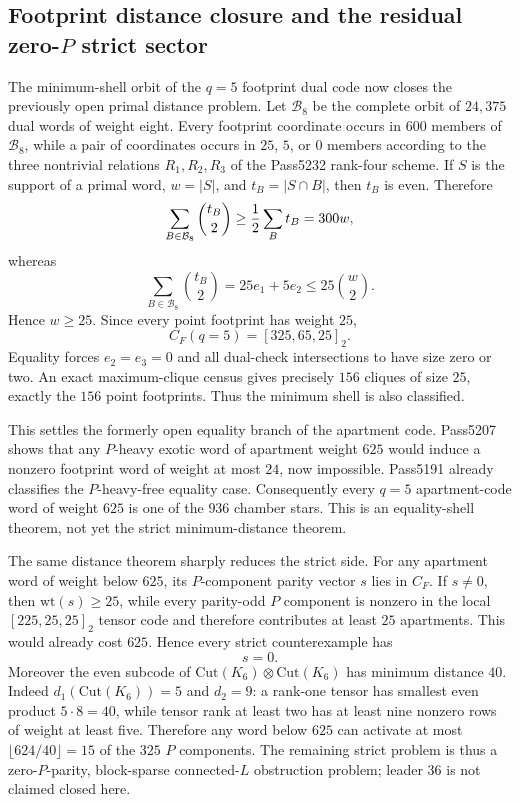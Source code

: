 \subsection{Footprint distance closure and the residual zero-$P$ strict sector}

The minimum-shell orbit of the $q=5$ footprint dual code now closes the
previously open primal distance problem.  Let $\mathcal B_8$ be the complete
orbit of $24{,}375$ dual words of weight eight.  Every footprint coordinate
occurs in $600$ members of $\mathcal B_8$, while a pair of coordinates occurs
in $25$, $5$, or $0$ members according to the three nontrivial relations
$R_1,R_2,R_3$ of the Pass5232 rank-four scheme.  If $S$ is the support of a
primal word, $w=|S|$, and $t_B=|S\cap B|$, then $t_B$ is even.  Therefore
\[
 \sum_{B\in\mathcal B_8}{t_B\choose2}\ge {1\over2}\sum_Bt_B=300w,
\]
whereas
\[
 \sum_{B\in\mathcal B_8}{t_B\choose2}=25e_1+5e_2
 \le25{w\choose2}.
\]
Hence $w\ge25$.  Since every point footprint has weight $25$,
\[
 \boxed{C_F(q=5)=[325,65,25]_2}.
\]
Equality forces $e_2=e_3=0$ and all dual-check intersections to have size zero
or two.  An exact maximum-clique census gives precisely $156$ cliques of size
$25$, exactly the $156$ point footprints.  Thus the minimum shell is also
classified.

This settles the formerly open equality branch of the apartment code.  Pass5207
shows that any $P$-heavy exotic word of apartment weight $625$ would induce a
nonzero footprint word of weight at most $24$, now impossible.  Pass5191 already
classifies the $P$-heavy-free equality case.  Consequently every $q=5$
apartment-code word of weight $625$ is one of the $936$ chamber stars.
This is an equality-shell theorem, not yet the strict minimum-distance theorem.

The same distance theorem sharply reduces the strict side.  For any apartment
word of weight below $625$, its $P$-component parity vector $s$ lies in $C_F$.
If $s\ne0$, then $\mathrm{wt}(s)\ge25$, while every parity-odd $P$ component is
nonzero in the local $[225,25,25]_2$ tensor code and therefore contributes at
least $25$ apartments.  This would already cost $625$.  Hence every strict
counterexample has
\[
 \boxed{s=0}.
\]
Moreover the even subcode of
$\mathrm{Cut}(K_6)\otimes\mathrm{Cut}(K_6)$ has minimum distance $40$.
Indeed $d_1(\mathrm{Cut}(K_6))=5$ and $d_2=9$: a rank-one tensor has smallest
even product $5\cdot8=40$, while tensor rank at least two has at least nine
nonzero rows of weight at least five.  Therefore any word below $625$ can
activate at most $\lfloor624/40\rfloor=15$ of the $325$ $P$ components.
The remaining strict problem is thus a zero-$P$-parity, block-sparse connected-$L$
obstruction problem; leader $36$ is not claimed closed here.


